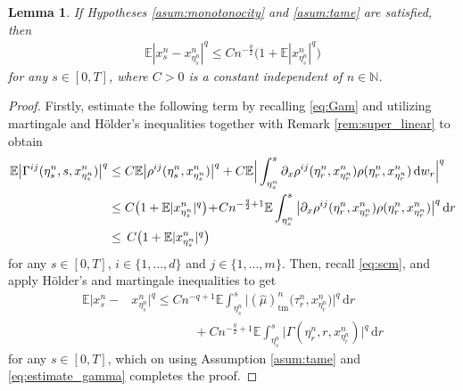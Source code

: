 \documentclass[reqno,  oneside, 12pt]{amsart}
\newtheorem{lemma}{Lemma}[section]
\newcommand{\E}{\mathbb E}
\begin{document}
\begin{lemma} \label{lem:one_step_error}
	If Hypotheses  \mbox{\normalfont  \ref{asum:monotonocity}} and \mbox{\normalfont  \ref{asum:tame}}  are satisfied, then 
	\begin{align*}
		\E|x_s^{n}-x_{\eta^n_s}^{n}|^{q}\leq  C
		n^{-\frac{q}{2}}\big(1+\E|x_{\eta^n_s}^{n}|^{q}\big)
	\end{align*}
	for any ${s\in[0,T]}$, where  $C>0$ is a constant  independent of  $n\in\mathbb N$.
\end{lemma}


\begin{proof} 
	Firstly,  estimate the following term by recalling \eqref{eq:Gam} and utilizing martingale and H\"older's  inequalities together with Remark \ref{rem:super_linear} to obtain 
	\begin{align} \label{eq:estimate_gamma}
		\E\big|  \Gamma^{ij}(\eta^n_s,s,x_{\eta^n_s}^{n})\big|^{q}&\leq C\E\big|  \rho^{ij}(\eta^n_s,x_{\eta^n_s}^{n})\big|^{q}+	C\E\Big| \int_{\eta^n_s}^{s} \partial_x\rho^{ij}(\eta^n_r,x_{\eta^n_r}^{n})\rho(\eta^n_r,x_{\eta^n_r}^{n})\,\mathrm{d}w_r\Big|^{q}  \notag
		\\
		&\leq\, \!C\big(1+\E|x_{\eta^n_s}^{n}|^{q}\big)\!+\!Cn^{-\frac{q}{2}+1}\E \int_{\eta^n_s}^{s}\big| \partial_x\rho^{ij}(\eta^n_r,x_{\eta^n_r}^{n})\rho(\eta^n_r,x_{\eta^n_r}^{n})\big|^{q}\,\mathrm{d}r \notag
		\\
		&\leq\, C\big(1+\E|x_{\eta^n_s}^{n}|^{q}\big)
	\end{align}
	for any $s\in[0,T]$, $i\in\{1,\ldots,d\}$ and $j\in\{1,\ldots,m\}$. Then, recall   \eqref{eq:scm}, and apply H\"older's and martingale  inequalities  to get
	\begin{align*} 
		\E|x_s^{n}-&x_{\eta^n_s}^{n}|^{q}			
		\leq  Cn^{-{q}+1}\E\int_{\eta^n_s}^s \big|(\widehat\mu)_{\mathrm{tm}}^{n}\big(\tau^n_r,x_{\eta^n_r}^{n}\big) \big|^{q}\, \mathrm{d}r 
		\\
		&\qquad\qquad\quad +Cn^{-\frac{q}{2}+1}\E\int_{\eta^n_s}^{s}\big|  \Gamma(\eta^n_r,r,x_{\eta^n_r}^{n})\big|^{q}  \, \mathrm{d}r 
	\end{align*}
	for any $s\in[0,T]$, which on  using Assumption  \ref{asum:tame} and  \eqref{eq:estimate_gamma} completes the proof. 
\end{proof}
\end{document}
